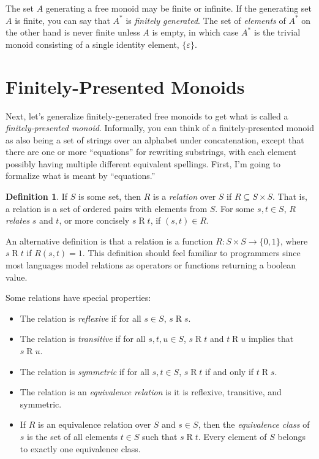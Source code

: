 \documentclass[a4paper,headsepline,bibliography=totoc,toc=flat,fleqn,twoside=semi]{scrbook}
\theoremstyle{definition}
\newtheorem{definition}{Definition}[chapter]
\theoremstyle{definition}
\theoremstyle{definition}
\begin{document}
The set $A$ generating a free monoid may be finite or infinite. If the generating set $A$ is finite, you can say that $A^*$ is \emph{finitely generated}. The set of \emph{elements} of $A^*$ on the other hand is never finite unless $A$ is empty, in which case $A^*$ is the trivial monoid consisting of a single identity element, $\{\varepsilon\}$.

\section{Finitely-Presented Monoids}
Next, let's generalize finitely-generated free monoids to get what is called a \emph{finitely-presented monoid}. Informally, you can think of a finitely-presented monoid as also being a set of strings over an alphabet under concatenation, except that there are one or more ``equations'' for rewriting substrings, with each element possibly having multiple different equivalent spellings. First, I'm going to formalize what is meant by ``equations.''

\begin{definition}\label{relationdef} If $S$ is some set, then $R$ is a \emph{relation} over $S$ if $R\subseteq S\times S$. That is, a relation is a set of ordered pairs with elements from $S$. For some $s, t\in S$, $R$ \emph{relates} $s$ and $t$, or more concisely $s\mathrel{R}t$, if $(s, t)\in R$.

An alternative definition is that a relation is a function $R\colon S\times S \rightarrow \{0, 1\}$, where $s\mathrel{R}t$ if $R(s, t)=1$. This definition should feel familiar to programmers since most languages model relations as operators or functions returning a boolean value.

Some relations have special properties:
\begin{itemize}
\item The relation is \emph{reflexive} if for all $s\in S$, $s\mathrel{R}s$.
\item The relation is \emph{transitive} if for all $s, t, u\in S$, $s\mathrel{R}t$ and $t\mathrel{R}u$ implies that $s\mathrel{R}u$.
\item The relation is \emph{symmetric} if for all $s, t\in S$, $s\mathrel{R}t$ if and only if $t\mathrel{R}s$.
\item The relation is an \emph{equivalence relation} is it is reflexive, transitive, and symmetric.
\item If $R$ is an equivalence relation over $S$ and $s\in S$, then the \emph{equivalence class} of $s$ is the set of all elements $t\in S$ such that $s\mathrel{R}t$. Every element of $S$ belongs to exactly one equivalence class.
\end{itemize}
\end{definition}
\end{document}
